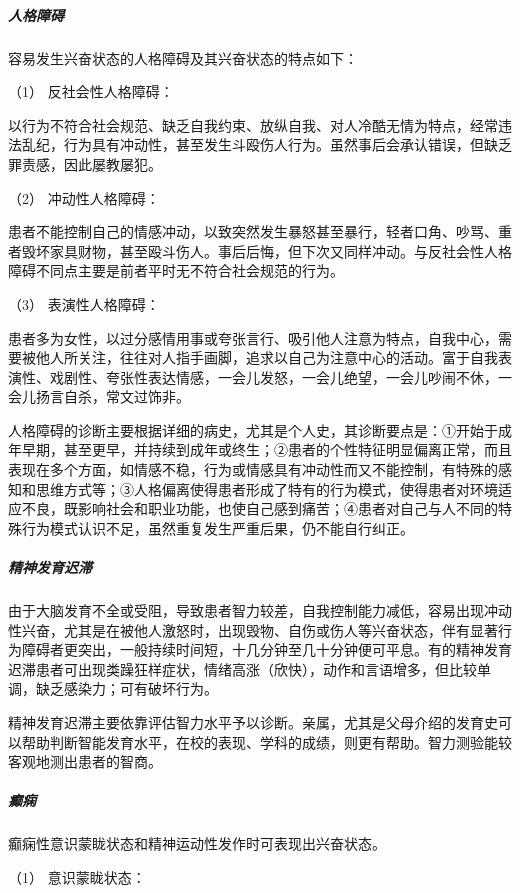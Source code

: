 \subparagraph{人格障碍}

容易发生兴奋状态的人格障碍及其兴奋状态的特点如下：

\hypertarget{text00043.htmlux5cux23CHP1-18-1-2-5-1}{}
（1） 反社会性人格障碍：

以行为不符合社会规范、缺乏自我约束、放纵自我、对人冷酷无情为特点，经常违法乱纪，行为具有冲动性，甚至发生斗殴伤人行为。虽然事后会承认错误，但缺乏罪责感，因此屡教屡犯。

\hypertarget{text00043.htmlux5cux23CHP1-18-1-2-5-2}{}
（2） 冲动性人格障碍：

患者不能控制自己的情感冲动，以致突然发生暴怒甚至暴行，轻者口角、吵骂、重者毁坏家具财物，甚至殴斗伤人。事后后悔，但下次又同样冲动。与反社会性人格障碍不同点主要是前者平时无不符合社会规范的行为。

\hypertarget{text00043.htmlux5cux23CHP1-18-1-2-5-3}{}
（3） 表演性人格障碍：

患者多为女性，以过分感情用事或夸张言行、吸引他人注意为特点，自我中心，需要被他人所关注，往往对人指手画脚，追求以自己为注意中心的活动。富于自我表演性、戏剧性、夸张性表达情感，一会儿发怒，一会儿绝望，一会儿吵闹不休，一会儿扬言自杀，常文过饰非。

人格障碍的诊断主要根据详细的病史，尤其是个人史，其诊断要点是：①开始于成年早期，甚至更早，并持续到成年或终生；②患者的个性特征明显偏离正常，而且表现在多个方面，如情感不稳，行为或情感具有冲动性而又不能控制，有特殊的感知和思维方式等；③人格偏离使得患者形成了特有的行为模式，使得患者对环境适应不良，既影响社会和职业功能，也使自己感到痛苦；④患者对自己与人不同的特殊行为模式认识不足，虽然重复发生严重后果，仍不能自行纠正。

\subparagraph{精神发育迟滞}

由于大脑发育不全或受阻，导致患者智力较差，自我控制能力减低，容易出现冲动性兴奋，尤其是在被他人激怒时，出现毁物、自伤或伤人等兴奋状态，伴有显著行为障碍者更突出，一般持续时间短，十几分钟至几十分钟便可平息。有的精神发育迟滞患者可出现类躁狂样症状，情绪高涨（欣快），动作和言语增多，但比较单调，缺乏感染力；可有破坏行为。

精神发育迟滞主要依靠评估智力水平予以诊断。亲属，尤其是父母介绍的发育史可以帮助判断智能发育水平，在校的表现、学科的成绩，则更有帮助。智力测验能较客观地测出患者的智商。

\subparagraph{癫痫}

癫痫性意识蒙眬状态和精神运动性发作时可表现出兴奋状态。

\hypertarget{text00043.htmlux5cux23CHP1-18-1-2-7-1}{}
（1） 意识蒙眬状态：

